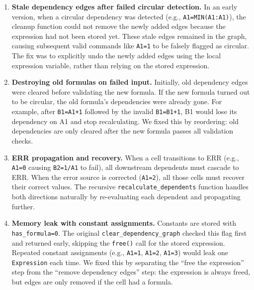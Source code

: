 \documentclass[11pt,a4paper]{article}
\begin{document}
\begin{enumerate}[leftmargin=*]
    \item \textbf{Stale dependency edges after failed circular detection.} In an early version, when a circular dependency was detected (e.g., \texttt{A1=MIN(A1:A1)}), the cleanup function could not remove the newly added edges because the expression had not been stored yet. These stale edges remained in the graph, causing subsequent valid commands like \texttt{A1=1} to be falsely flagged as circular. The fix was to explicitly undo the newly added edges using the local expression variable, rather than relying on the stored expression.

    \item \textbf{Destroying old formulas on failed input.} Initially, old dependency edges were cleared before validating the new formula. If the new formula turned out to be circular, the old formula's dependencies were already gone. For example, after \texttt{B1=A1+1} followed by the invalid \texttt{B1=B1+1}, B1 would lose its dependency on A1 and stop recalculating. We fixed this by reordering: old dependencies are only cleared after the new formula passes all validation checks.

    \item \textbf{ERR propagation and recovery.} When a cell transitions to ERR (e.g., \texttt{A1=0} causing \texttt{B2=1/A1} to fail), all downstream dependents must cascade to ERR. When the error source is corrected (\texttt{A1=2}), all those cells must recover their correct values. The recursive \texttt{recalculate\_dependents} function handles both directions naturally by re-evaluating each dependent and propagating further.

    \item \textbf{Memory leak with constant assignments.} Constants are stored with \texttt{has\_formula=0}. The original \texttt{clear\_dependency\_graph} checked this flag first and returned early, skipping the \texttt{free()} call for the stored expression. Repeated constant assignments (e.g., \texttt{A1=1}, \texttt{A1=2}, \texttt{A1=3}) would leak one \texttt{Expression} each time. We fixed this by separating the ``free the expression'' step from the ``remove dependency edges'' step: the expression is always freed, but edges are only removed if the cell had a formula.
\end{enumerate}

\newpage

\end{document}
